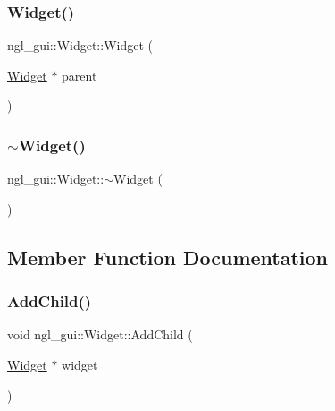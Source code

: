 \subsubsection{\texorpdfstring{Widget()}{Widget()}}
{\footnotesize\ttfamily ngl\+\_\+gui\+::\+Widget\+::\+Widget (\begin{DoxyParamCaption}\item[{\mbox{\hyperlink{classngl__gui_1_1_widget}{Widget}} $\ast$}]{parent }\end{DoxyParamCaption})\hspace{0.3cm}{\ttfamily [explicit]}}

\mbox{\label{classngl__gui_1_1_widget_a014c3b016418bd51cd5770ae0e52ae39}} 
\subsubsection{\texorpdfstring{$\sim$\+Widget()}{~Widget()}}
{\footnotesize\ttfamily ngl\+\_\+gui\+::\+Widget\+::$\sim$\+Widget (\begin{DoxyParamCaption}{ }\end{DoxyParamCaption})\hspace{0.3cm}{\ttfamily [virtual]}}



\subsection{Member Function Documentation}
\mbox{\label{classngl__gui_1_1_widget_a37128e55931fa4fe2f99556d4a45607a}} 
\subsubsection{\texorpdfstring{Add\+Child()}{AddChild()}}
{\footnotesize\ttfamily void ngl\+\_\+gui\+::\+Widget\+::\+Add\+Child (\begin{DoxyParamCaption}\item[{\mbox{\hyperlink{classngl__gui_1_1_widget}{Widget}} $\ast$}]{widget }\end{DoxyParamCaption})\hspace{0.3cm}{\ttfamily [virtual]}}



